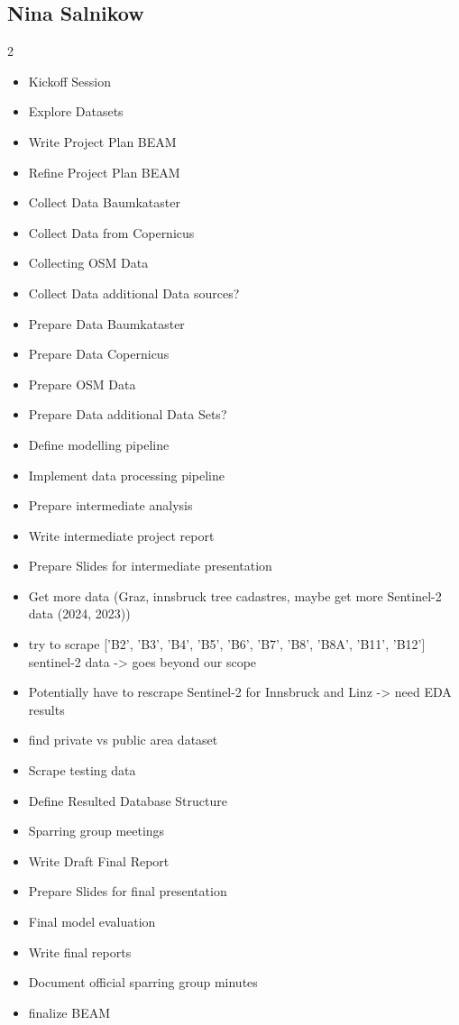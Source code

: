 \vspace{-1em}

\subsection*{Nina Salnikow}

{\footnotesize
\begin{multicols}{2}
\begin{itemize}[leftmargin=*, nosep]
    \item Kickoff Session
    \item Explore Datasets
    \item Write Project Plan BEAM
    \item Refine Project Plan BEAM
    \item Collect Data Baumkataster
    \item Collect Data from Copernicus
    \item Collecting OSM Data
    \item Collect Data additional Data sources?
    \item Prepare Data Baumkataster
    \item Prepare Data Copernicus
    \item Prepare OSM Data
    \item Prepare Data additional Data Sets?
    \item Define modelling pipeline
    \item Implement data processing pipeline
    \item Prepare intermediate analysis
    \item Write intermediate project report
    \item Prepare Slides for intermediate presentation
    \item Get more data (Graz, innsbruck tree cadastres, maybe get more Sentinel-2 data (2024, 2023))
    \item try to scrape ['B2', 'B3', 'B4', 'B5', 'B6', 'B7', 'B8', 'B8A', 'B11', 'B12'] sentinel-2 data -> goes beyond our scope
    \item Potentially have to rescrape Sentinel-2 for Innsbruck and Linz -> need EDA results
    \item find private vs public area dataset
    \item Scrape testing data
    \item Define Resulted Database Structure
    \item Sparring group meetings
    \item Write Draft Final Report
    \item Prepare Slides for final presentation
    \item Final model evaluation
    \item Write final reports
    \item Document official sparring group minutes
    \item finalize BEAM
\end{itemize}
\end{multicols}
}

